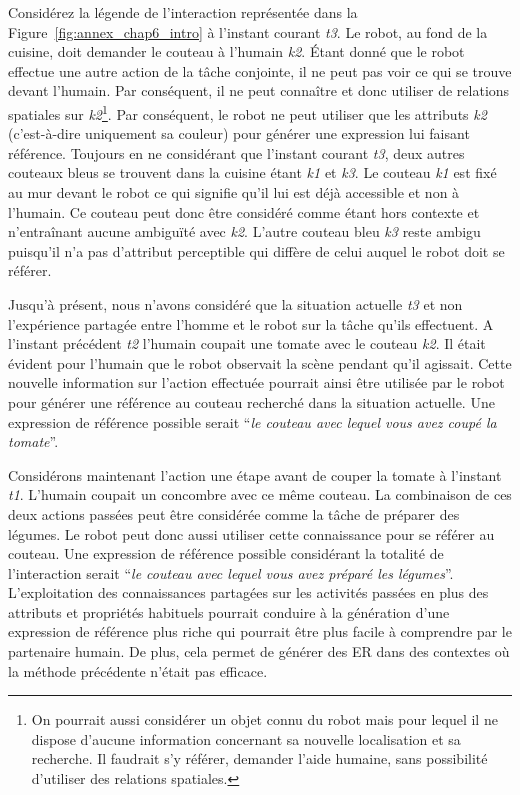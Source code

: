 Considérez la légende de l'interaction représentée dans la Figure~\ref{fig:annex_chap6_intro} à l'instant courant \textit{t3}. Le robot, au fond de la cuisine, doit demander le couteau à l'humain \textit{k2}. Étant donné que le robot effectue une autre action de la tâche conjointe, il ne peut pas voir ce qui se trouve devant l'humain. Par conséquent, il ne peut connaître et donc utiliser de relations spatiales sur \textit{k2}\footnote{On pourrait aussi considérer un objet connu du robot mais pour lequel il ne dispose d'aucune information concernant sa nouvelle localisation et sa recherche. Il faudrait s'y référer, demander l'aide humaine, sans possibilité d'utiliser des relations spatiales.}. Par conséquent, le robot ne peut utiliser que les attributs \textit{k2} (c'est-à-dire uniquement sa couleur) pour générer une expression lui faisant référence. Toujours en ne considérant que l'instant courant \textit{t3}, deux autres couteaux bleus se trouvent dans la cuisine étant \textit{k1} et \textit{k3}. Le couteau \textit{k1} est fixé au mur devant le robot ce qui signifie qu'il lui est déjà accessible et non à l'humain. Ce couteau peut donc être considéré comme étant hors contexte et n'entraînant aucune ambiguïté avec \textit{k2}. L'autre couteau bleu \textit{k3} reste ambigu puisqu'il n'a pas d'attribut perceptible qui diffère de celui auquel le robot doit se référer.

Jusqu'à présent, nous n'avons considéré que la situation actuelle \textit{t3} et non l'expérience partagée entre l'homme et le robot sur la tâche qu'ils effectuent. A l'instant précédent \textit{t2} l'humain coupait une tomate avec le couteau \textit{k2}. Il était évident pour l'humain que le robot observait la scène pendant qu'il agissait. Cette nouvelle information sur l'action effectuée pourrait ainsi être utilisée par le robot pour générer une référence au couteau recherché dans la situation actuelle. Une expression de référence possible serait ``\textit{le couteau avec lequel vous avez coupé la tomate}''.

Considérons maintenant l'action une étape avant de couper la tomate à l'instant \textit{t1}. L'humain coupait un concombre avec ce même couteau. La combinaison de ces deux actions passées peut être considérée comme la tâche de préparer des légumes. Le robot peut donc aussi utiliser cette connaissance pour se référer au couteau. Une expression de référence possible considérant la totalité de l'interaction serait ``\textit{le couteau avec lequel vous avez préparé les légumes}''. L'exploitation des connaissances partagées sur les activités passées en plus des attributs et propriétés habituels pourrait conduire à la génération d'une expression de référence plus riche qui pourrait être plus facile à comprendre par le partenaire humain. De plus, cela permet de générer des ER dans des contextes où la méthode précédente n'était pas efficace.

